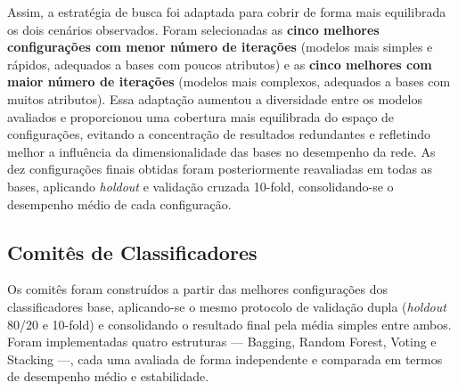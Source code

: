 \documentclass[12pt]{article}
\begin{document}
\begin{enumerate}
    Assim, a estratégia de busca foi adaptada para cobrir de forma mais equilibrada os dois cenários observados. Foram selecionadas as \textbf{cinco melhores configurações com menor número de iterações} (modelos mais simples e rápidos, adequados a bases com poucos atributos) e as \textbf{cinco melhores com maior número de iterações} (modelos mais complexos, adequados a bases com muitos atributos).  
    Essa adaptação aumentou a diversidade entre os modelos avaliados e proporcionou uma cobertura mais equilibrada do espaço de configurações, evitando a concentração de resultados redundantes e refletindo melhor a influência da dimensionalidade das bases no desempenho da rede.  
    As dez configurações finais obtidas foram posteriormente reavaliadas em todas as bases, aplicando \textit{holdout} e validação cruzada 10-fold, consolidando-se o desempenho médio de cada configuração.
\end{enumerate}

\subsection{Comitês de Classificadores}

Os comitês foram construídos a partir das melhores configurações dos classificadores base, aplicando-se o mesmo protocolo de validação dupla (\textit{holdout} 80/20 e 10-fold) e consolidando o resultado final pela média simples entre ambos.  
Foram implementadas quatro estruturas — Bagging, Random Forest, Voting e Stacking —, cada uma avaliada de forma independente e comparada em termos de desempenho médio e estabilidade.
\end{document}
